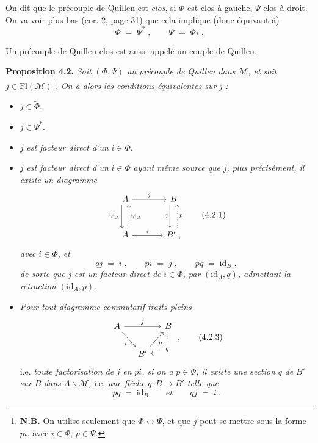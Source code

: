 \documentclass[11pt]{article}
\newcommand{\printedpage}[1]{\marginpar{\footnotesize p.~#1}}
\newcommand{\msp}[1]{\marginpar{\footnotesize [#1]}}
\newcommand{\Fl}{\mathrm{Fl}}
\newcommand{\id}{\mathrm{id}}
\begin{document}
On dit que le précouple de Quillen est \textit{clos}, si $\Phi$ est clos à gauche, $\Psi$ clos à droit. On va voir plus bas (cor. 2, page 31) que cela implique (donc équivaut à) %
\[
\Phi \;=\; \Psi^*\;, \qquad \Psi \;=\; \Phi_*\ .
\tag*{(4.1.3)}
\]

\msp{page 29}
Un précouple de Quillen clos est aussi appelé un couple de Quillen.

\textbf{Proposition 4.2.} \textit{Soit} $(\Phi,\Psi)$ \textit{un précouple de Quillen dans} $\mathcal{M}$\textit{, et soit} $j\in\Fl(\mathcal{M})$\footnote[9]{\textbf{N.B.} On utilise seulement que $\Phi\longleftrightarrow\Psi$, et que $j$ peut se mettre sous la forme $pi$, avec $i\in\Phi$, $p\in\Psi$.}. %
\textit{On a alors les conditions équivalentes sur} $j$ \textit{:}
\begin{itemize}[leftmargin=2.5em]
\item[a)] $j\in\widetilde{\Phi}$.
\item[b)] $j\in\Psi^*$.
\item[c)] $j$ \textit{est facteur direct d'un} $i\in\Phi$.
\item[c$'$)] $j$ \textit{est facteur direct d'un} $i\in\Phi$ \textit{ayant même source que} $j$\textit{, plus précisément, il existe un diagramme}
\[
\begin{tikzcd}[row sep=large, column sep=large]
A \arrow[r, "j"] \arrow[d, shift right=1ex, "\id_A"'] & B \arrow[d, shift right=1ex, "q"'] \\
A \arrow[u, dotted, shift right=1ex, "\id_A"'] \arrow[r, "i"] & B' \;, \arrow[u, dotted, shift right=1ex, "p"']
\end{tikzcd}
\tag*{(4.2.1)}
\]
\printedpage{20}
\textit{avec} $i\in\Phi$\textit{, et}
\[
qj \;=\; i\;, \qquad pi \;=\; j\;, \qquad pq \;=\; \id_B\;,
\tag*{(4.2.2)}
\]
\textit{de sorte que} $j$ \textit{est un facteur direct de} $i\in\Phi$\textit{, par} $(\id_A,q)$\textit{, admettant la rétraction} $(\id_A,p)$.
\item[d)] \textit{Pour tout diagramme commutatif traits pleins}
\[
\begin{tikzcd}[column sep=small]
A \arrow[rr, "j"] \arrow[dr, "i"'] & & B \arrow[dl, dotted, bend left=40, "q"] \\
& B' \arrow[ur, "p"'] &
\end{tikzcd}
\;,
\tag*{(4.2.3)}
\]
i.e. \textit{toute factorisation de} $j$ \textit{en} $pi$\textit{, si on a} $p\in\Psi$\textit{, il existe une section} $q$ \textit{de} $B'$ \textit{sur} $B$ \textit{dans} $A\backslash\mathcal{M}$\textit{,} i.e. \textit{une flèche} $q:B\longrightarrow B'$ \textit{telle que}
\[
pq \;=\; \id_B \qquad \textit{et} \qquad qj \;=\; i\ .
\]
\end{itemize}
\end{document}
